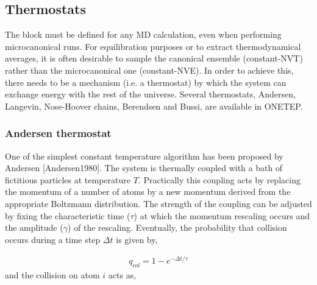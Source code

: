 \documentclass[letterpaper,10pt,english]{sphinxmanual}
\begin{document}
%
\begin{sphinxVerbatim}[commandchars=\\\{\}]
            
       
     
   
      
\end{sphinxVerbatim}


\subsection{Thermostats}
\label{\detokenize{BOMD:thermostats}}
The  block must be defined for any MD calculation, even
when performing microcanonical runs. For equilibration purposes or to
extract thermodynamical averages, it is often desirable to sample the
canonical ensemble (constant-NVT) rather than the microcanonical one
(constant-NVE). In order to achieve this, there needs to be a mechanism
(i.e. a thermostat) by which the system can exchange energy with the
rest of the universe. Several thermostats, Andersen, Langevin,
Nose-Hoover chains, Berendsen and Bussi, are available in ONETEP.


\subsubsection{Andersen thermostat}
\label{\detokenize{BOMD:andersen-thermostat}}
One of the simplest constant temperature algorithm has been proposed by
Andersen {[}Andersen1980{]}. The system is thermally coupled
with a bath of fictitious particles at temperature \(T\).
Practically this coupling acts by replacing the momentum of a number of
atoms by a new momentum derived from the appropriate Boltzmann
distribution. The strength of the coupling can be adjusted by fixing the
characteristic time (\(\tau\)) at which the momentum rescaling
occurs and the amplitude (\(\gamma\)) of the rescaling. Eventually,
the probability that collision occurs during a time step
\(\Delta t\) is given by,

\label{\detokenize{BOMD:equation-ander1}}\begin{equation}\label{equation:BOMD:ander1}
\begin{split}q_{col} = 1 - e^{- \Delta t / \tau}\end{split}
\end{equation}
and the collision on atom \(i\) acts as,
\end{document}
